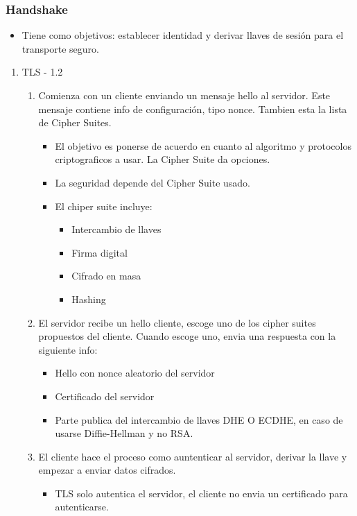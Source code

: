 \documentclass[11pt]{article}
\begin{document}
\subsubsection{Handshake}
\label{sec:orgffc6877}
\begin{itemize}
\item Tiene como objetivos: establecer identidad y derivar llaves de sesión para el transporte seguro.
\end{itemize}
\begin{enumerate}
\item TLS - 1.2
\label{sec:org4bb8692}
\begin{enumerate}
\item Comienza con un cliente enviando un mensaje hello al servidor. Este mensaje contiene info de configuración, tipo nonce. Tambien esta la lista de Cipher Suites.
\begin{itemize}
\item El objetivo es ponerse de acuerdo en cuanto al algoritmo y protocolos criptograficos a usar. La Cipher Suite da opciones.
\item La seguridad depende del Cipher Suite usado.
\item El chiper suite incluye:
\begin{itemize}
\item Intercambio de llaves
\item Firma digital
\item Cifrado en masa
\item Hashing
\end{itemize}
\end{itemize}
\item El servidor recibe un hello cliente, escoge uno de los cipher suites propuestos del cliente. Cuando escoge uno, envia una respuesta con la siguiente info:
\begin{itemize}
\item Hello con nonce aleatorio del servidor
\item Certificado del servidor
\item Parte publica del intercambio de llaves DHE O ECDHE, en caso de usarse Diffie-Hellman y no RSA.
\end{itemize}
\item El cliente hace el proceso como auntenticar al servidor, derivar la llave y empezar a enviar datos cifrados.
\begin{itemize}
\item TLS solo autentica el servidor, el cliente no envia un certificado para autenticarse.

\end{itemize}
\end{enumerate}
\end{enumerate}
\end{document}
